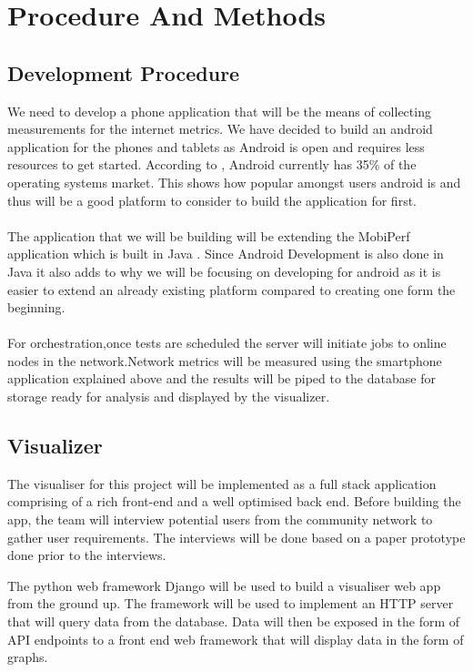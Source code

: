 \section{Procedure And Methods}
\subsection{Development Procedure}
We need to develop a phone application that will be the means of collecting measurements for the internet metrics. We have decided to build an android application for the phones and tablets as Android is open and requires less resources to get started. According to \cite{statcounter_global_stats}, Android currently has 35\% of the operating systems market. This shows how popular amongst users android is and thus will be a good platform to consider to build the application for first. 
\paragraph{}
The application that we will be building will be extending the MobiPerf application which is built in Java \cite{m-lab}. Since Android Development is also done in Java it also adds to why we will be focusing on developing for android as it is easier to extend an already existing platform compared to creating one form the beginning.

\paragraph{}
For orchestration,once tests are scheduled the server will initiate jobs to online nodes in the network.Network metrics will be measured using the smartphone application explained above and the results will be piped to the database for storage ready for analysis and displayed by the visualizer.    

\subsection{Visualizer}
The visualiser for this project will be implemented as a full stack application comprising of a rich front-end and a well optimised back end. Before building the app, the team will interview potential users from the community network to gather user requirements. The interviews will be done based on a paper prototype done prior to the interviews.

The python web framework Django will be used to build a visualiser web app from the ground up. The framework will be used to implement an HTTP server that will query data from the database. Data will then be exposed in the form of API endpoints to a front end web framework that will display data in the form of graphs.

